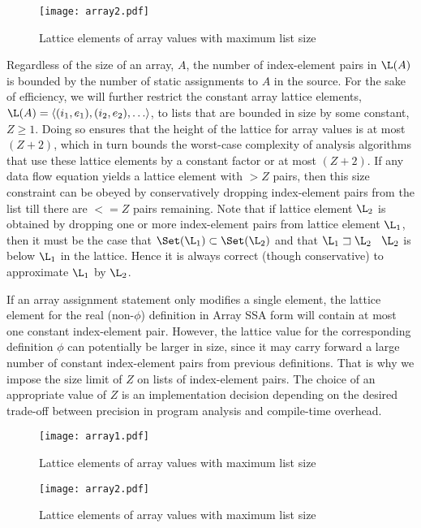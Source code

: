 \begin{figure}%
\centerline{\texttt{[image: array2.pdf]}}
\caption{Lattice elements of array values with maximum list size }
\label{fig:array2}
\end{figure}

Regardless of the size of an array, $A$, the number
of index-element pairs in  $\L(A)$ is bounded by the number of
static assignments to $A$ in the source. 
For the sake of efficiency, we will further restrict the constant array lattice
elements, $\L(A) = \langle(i_1,e_1), (i_2,e_2), \ldots\rangle$,
to lists that are bounded in size by some constant, $Z\geq 1$.
Doing so ensures
that the height of the lattice for array values is at most $(Z+2)$,
which in turn bounds the worst-case complexity of analysis algorithms
that use these lattice elements by a constant factor or at most $(Z+2)$.
If any data flow equation yields a lattice element with $>Z$ pairs, then
this size constraint can be obeyed by conservatively dropping 
index-element pairs
from the list till there are $<= Z$ pairs remaining.  Note that if
lattice element $\L_2$ is obtained by dropping one or more index-element pairs
from lattice element $\L_1$, then it must be the case that 
$\Set(\L_1) \subset \Set(\L_2)$ and that $\L_1  \sqsupset \L_2$ \ie\ 
$\L_2$ is below $\L_1$ in the lattice.  Hence it is always correct (though
conservative) to approximate $\L_1$ by $\L_2$.


If an array assignment statement only modifies a single element, the
lattice element for the real (non-$\phi$) definition in Array SSA form
will contain at most one constant
index-element pair.  However, the lattice
value for the corresponding definition $\phi$ can potentially be
larger in size, since it may carry forward a large number of constant
index-element pairs from previous definitions.  That is why we impose
the size limit of $Z$ on lists of index-element pairs.  The choice of
an appropriate value of $Z$ is an implementation decision depending on the
desired trade-off between precision in program analysis and compile-time
overhead.


\begin{figure}%
\centerline{\texttt{[image: array1.pdf]}}
\caption{Lattice elements of array values with maximum list size }
\label{fig:array1}
\end{figure}

\begin{figure}%
\centerline{\texttt{[image: array2.pdf]}}
\caption{Lattice elements of array values with maximum list size }
\label{fig:array2}
\end{figure}


